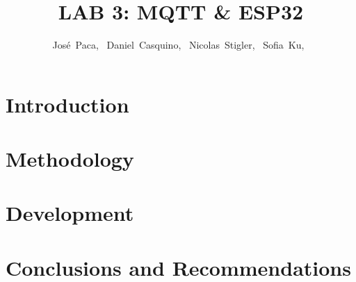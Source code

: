 \documentclass[journal]{IEEEtran}
\newcommand{\labpath}{}
\begin{document}
\raggedbottom
\title{LAB 3: MQTT \& ESP32}
\author{José~Paca,~
  Daniel~Casquino,~
  Nicolas~Stigler,~
  Sofia~Ku,~%
}
\maketitle
\section{Introduction}

\section{Methodology}

\section{Development}

\section{Conclusions and Recommendations}



\end{document}
